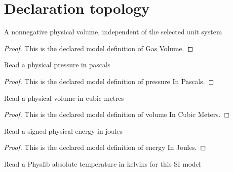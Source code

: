 \section{Declaration topology}
\begin{definition}
  \label{def:physics:phyx-mini-0351:phyxminiproblems-problemphyxmini0351-gasvolume}
  A nonnegative physical volume, independent of the selected unit system
\end{definition}
\begin{proof}
  This is the declared model definition of Gas Volume.
\end{proof}
\begin{definition}
  \label{def:physics:phyx-mini-0351:phyxminiproblems-problemphyxmini0351-pressureinpascals}
  Read a physical pressure in pascals
\end{definition}
\begin{proof}
  This is the declared model definition of pressure In Pascals.
\end{proof}
\begin{definition}
  \label{def:physics:phyx-mini-0351:phyxminiproblems-problemphyxmini0351-volumeincubicmeters}
  Read a physical volume in cubic metres
\end{definition}
\begin{proof}
  This is the declared model definition of volume In Cubic Meters.
\end{proof}
\begin{definition}
  \label{def:physics:phyx-mini-0351:phyxminiproblems-problemphyxmini0351-energyinjoules}
  Read a signed physical energy in joules
\end{definition}
\begin{proof}
  This is the declared model definition of energy In Joules.
\end{proof}
\begin{definition}
  \label{def:physics:phyx-mini-0351:phyxminiproblems-problemphyxmini0351-temperatureinkelvins}
  Read a Physlib absolute temperature in kelvins for this SI model
\end{definition}
